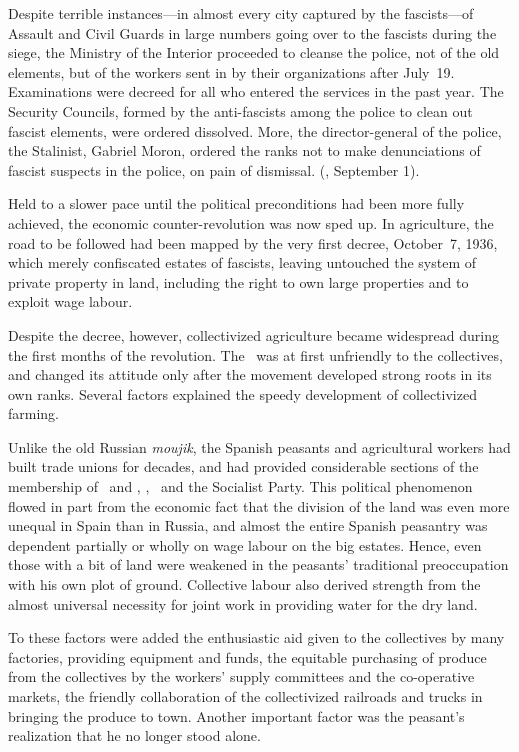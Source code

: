 Despite terrible instances---in almost every city captured by the fascists---of Assault and Civil Guards in large numbers going over to the fascists during the siege, the Ministry of the Interior proceeded to cleanse the police, not of the old elements, but of the workers sent in by their organizations after July~19. Examinations were decreed for all who entered the services in the past year. The Security Councils, formed by the anti-fascists among the police to clean out fascist elements, were ordered dissolved. More, the director-general of the police, the Stalinist, Gabriel Moron, ordered the ranks not to make denunciations of fascist suspects in the police, on pain of dismissal. (\emph{\CNT}, September 1).

Held to a slower pace until the political preconditions had been more fully achieved, the economic counter-revolution was now sped up. In agriculture, the road to be followed had been mapped by the very first decree, October~7, 1936, which merely confiscated estates of fascists, leaving untouched the system of private property in land, including the right to own large properties and to exploit wage labour.

Despite the decree, however, collectivized agriculture became widespread during the first months of the revolution. The \UGT\ was at first unfriendly to the collectives, and changed its attitude only after the movement developed strong roots in its own ranks. Several factors explained the speedy development of collectivized farming.

Unlike the old Russian \emph{moujik}, the Spanish peasants and agricultural workers had built trade unions for decades, and had provided considerable sections of the membership of \CNT\ and \FAI, \UGT, \POUM\ and the Socialist Party. This political phenomenon flowed in part from the economic fact that the division of the land was even more unequal in Spain than in Russia, and almost the entire Spanish peasantry was dependent partially or wholly on wage labour on the big estates. Hence, even those with a bit of land were weakened in the peasants’ traditional preoccupation with his own plot of ground. Collective labour also derived strength from the almost universal necessity for joint work in providing water for the dry land.

To these factors were added the enthusiastic aid given to the collectives by many factories, providing equipment and funds, the equitable purchasing of produce from the collectives by the workers’ supply committees and the co-operative markets, the friendly collaboration of the collectivized railroads and trucks in bringing the produce to town. Another important factor was the peasant’s realization that he no longer stood alone.

